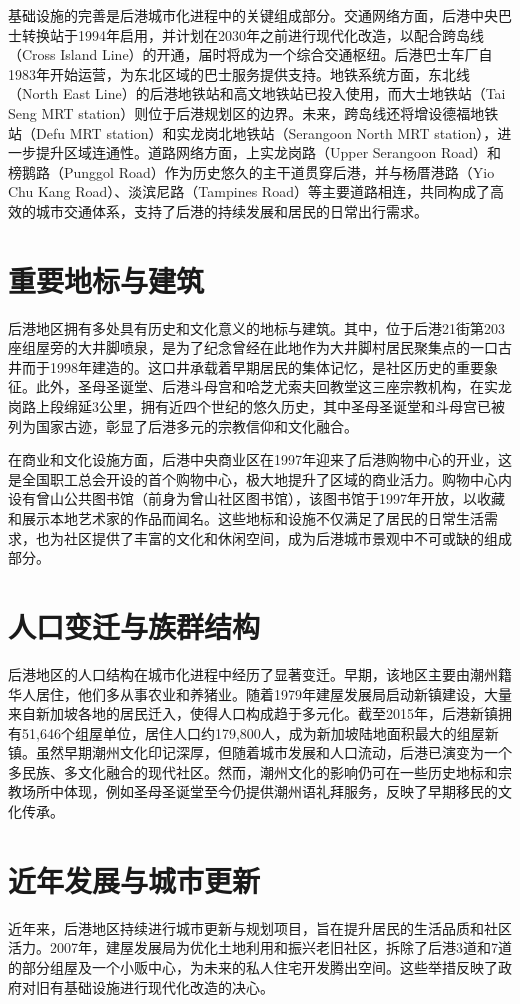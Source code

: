 \documentclass[11pt,a4paper,twoside,openany]{book}
\begin{document}
基础设施的完善是后港城市化进程中的关键组成部分。交通网络方面，后港中央巴士转换站于1994年启用，并计划在2030年之前进行现代化改造，以配合跨岛线（Cross Island Line）的开通，届时将成为一个综合交通枢纽。后港巴士车厂自1983年开始运营，为东北区域的巴士服务提供支持。地铁系统方面，东北线（North East Line）的后港地铁站和高文地铁站已投入使用，而大士地铁站（Tai Seng MRT station）则位于后港规划区的边界。未来，跨岛线还将增设德福地铁站（Defu MRT station）和实龙岗北地铁站（Serangoon North MRT station），进一步提升区域连通性。道路网络方面，上实龙岗路（Upper Serangoon Road）和榜鹅路（Punggol Road）作为历史悠久的主干道贯穿后港，并与杨厝港路（Yio Chu Kang Road）、淡滨尼路（Tampines Road）等主要道路相连，共同构成了高效的城市交通体系，支持了后港的持续发展和居民的日常出行需求。

\section{重要地标与建筑}
后港地区拥有多处具有历史和文化意义的地标与建筑。其中，位于后港21街第203座组屋旁的大井脚喷泉，是为了纪念曾经在此地作为大井脚村居民聚集点的一口古井而于1998年建造的。这口井承载着早期居民的集体记忆，是社区历史的重要象征。此外，圣母圣诞堂、后港斗母宫和哈芝尤索夫回教堂这三座宗教机构，在实龙岗路上段绵延3公里，拥有近四个世纪的悠久历史，其中圣母圣诞堂和斗母宫已被列为国家古迹，彰显了后港多元的宗教信仰和文化融合。

在商业和文化设施方面，后港中央商业区在1997年迎来了后港购物中心的开业，这是全国职工总会开设的首个购物中心，极大地提升了区域的商业活力。购物中心内设有曾山公共图书馆（前身为曾山社区图书馆），该图书馆于1997年开放，以收藏和展示本地艺术家的作品而闻名。这些地标和设施不仅满足了居民的日常生活需求，也为社区提供了丰富的文化和休闲空间，成为后港城市景观中不可或缺的组成部分。

\section{人口变迁与族群结构}
后港地区的人口结构在城市化进程中经历了显著变迁。早期，该地区主要由潮州籍华人居住，他们多从事农业和养猪业。随着1979年建屋发展局启动新镇建设，大量来自新加坡各地的居民迁入，使得人口构成趋于多元化。截至2015年，后港新镇拥有51,646个组屋单位，居住人口约179,800人，成为新加坡陆地面积最大的组屋新镇。虽然早期潮州文化印记深厚，但随着城市发展和人口流动，后港已演变为一个多民族、多文化融合的现代社区。然而，潮州文化的影响仍可在一些历史地标和宗教场所中体现，例如圣母圣诞堂至今仍提供潮州语礼拜服务，反映了早期移民的文化传承。

\section{近年发展与城市更新}
近年来，后港地区持续进行城市更新与规划项目，旨在提升居民的生活品质和社区活力。2007年，建屋发展局为优化土地利用和振兴老旧社区，拆除了后港3道和7道的部分组屋及一个小贩中心，为未来的私人住宅开发腾出空间。这些举措反映了政府对旧有基础设施进行现代化改造的决心。
\end{document}
